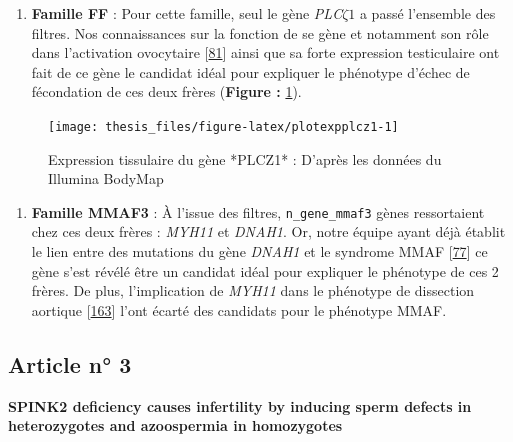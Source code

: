 \documentclass[12pt,twoside]{reedthesis}
\providecommand{\tightlist}{%
  \setlength{\itemsep}{0pt}\setlength{\parskip}{0pt}}
\theoremstyle{definition}
\theoremstyle{definition}
\theoremstyle{remark}
\begin{document}
  \newpage
  
  \newpage  
  
  \begin{enumerate}
  \def\labelenumi{\arabic{enumi}.}
  \setcounter{enumi}{1}
  \tightlist
  \item
    \textbf{Famille FF} : Pour cette famille, seul le gène
    \emph{PLC}\(\zeta 1\) a passé l'ensemble des filtres. Nos
    connaissances sur la fonction de se gène et notamment son rôle dans
    l'activation ovocytaire {[}\protect\hyperlink{ref-Amdani2013}{81}{]}
    ainsi que sa forte expression testiculaire ont fait de ce gène le
    candidat idéal pour expliquer le phénotype d'échec de fécondation de
    ces deux frères (\textbf{Figure : }\ref{fig:plotexpplcz1}).
  \end{enumerate}
  
  \begin{figure}
  
  {\centering \texttt{[image: thesis\_files/figure-latex/plotexpplcz1-1]} 
  
  }
  
  \caption[Expression tissulaire du gène *PLCZ1*]{Expression tissulaire du gène *PLCZ1* : D'après les données du Illumina BodyMap}\label{fig:plotexpplcz1}
  \end{figure}
  
  \begin{enumerate}
  \def\labelenumi{\arabic{enumi}.}
  \setcounter{enumi}{3}
  \tightlist
  \item
    \textbf{Famille MMAF3} : À l'issue des filtres,
    \texttt{n\_gene\_mmaf3} gènes ressortaient chez ces deux frères :
    \emph{MYH11} et \emph{DNAH1}. Or, notre équipe ayant déjà établit le
    lien entre des mutations du gène \emph{DNAH1} et le syndrome MMAF
    {[}\protect\hyperlink{ref-BenKhelifa2014}{77}{]} ce gène s'est révélé
    être un candidat idéal pour expliquer le phénotype de ces 2 frères. De
    plus, l'implication de \emph{MYH11} dans le phénotype de dissection
    aortique {[}\protect\hyperlink{ref-Imai2015}{163}{]} l'ont écarté des
    candidats pour le phénotype MMAF.
  \end{enumerate}
  
  \newpage
  
  \subsection{Article n° 3}\label{article-n-3}
  
  \textbf{SPINK2 deficiency causes infertility by inducing sperm defects
  in heterozygotes and azoospermia in homozygotes}
  
\end{document}
